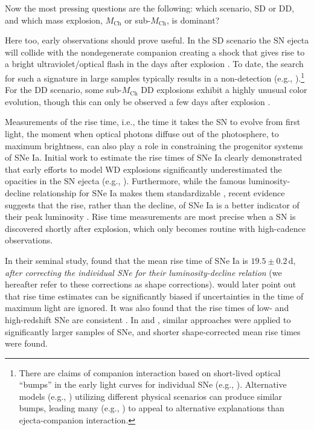 \documentclass[twocolumn]{./aastex63}
\begin{document}
Now the most pressing questions are the following: which scenario, SD or DD,
and which mass explosion, $M_\mathrm{Ch}$ or sub-$M_\mathrm{Ch}$, is dominant?

Here too, early observations should prove useful. In the SD scenario the SN
ejecta will collide with the nondegenerate companion creating a shock that
gives rise to a bright ultraviolet/optical flash in the days after explosion
\citep{Kasen10a}. To date, the search for such a signature in large samples
typically results in a non-detection (e.g.,
\citealt{Hayden10,Ganeshalingam11,Bianco11}).\footnote{There are claims of
companion interaction based on short-lived optical ``bumps'' in the early
light curves for individual SNe (e.g.,
\citealt{Cao15,Marion16,Hosseinzadeh17,Dimitriadis19}). Alternative models
(e.g., \citealt{Dessart14,Piro16}) utilizing different physical scenarios can
produce similar bumps, leading many (e.g.,
\citealt{Kromer16,Shappee16a,Noebauer17,Miller18,Shappee19}) to appeal to
alternative explanations than ejecta-companion interaction.} For the DD
scenario, some sub-$M_\mathrm{Ch}$ DD explosions exhibit a highly unusual
color evolution, though this can only be observed a few days after explosion
\citep{Noebauer17,Polin19}.

Measurements of the rise time, i.e., the time it takes the SN to evolve from
first light, the moment when optical photons diffuse out of the photosphere, to
maximum brightness, can also play a role in constraining the progenitor systems
of SNe Ia. Initial work to estimate the rise times of SNe Ia clearly
demonstrated that early efforts to model WD explosions significantly
underestimated the opacities in the SN ejecta (e.g., \citealt{Riess99a}).
Furthermore, while the famous luminosity-decline relationship for SNe Ia makes
them standardizable \citep{Phillips93}, recent evidence suggests that the rise,
rather than the decline, of SNe Ia is a better indicator of their peak
luminosity \citep{Hayden19}. Rise time measurements are most precise when a SN
is discovered shortly after explosion, which only becomes routine with
high-cadence observations.

In their seminal study, \citet{Riess99a} found that the mean rise time of SNe
Ia is $19.5 \pm 0.2$\,d, \textit{after correcting the individual SNe for their
luminosity-decline relation} (we hereafter refer to these corrections as shape
corrections). \citet{Aldering00} would later point out that rise time
estimates can be significantly biased if uncertainties in the time of maximum
light are ignored. It was also found that the rise times of low- and
high-redshift SNe are consistent \citep{Aldering00,Conley06}. In
\citet{Hayden10} and \citet{Ganeshalingam11}, similar approaches were applied
to significantly larger samples of SNe, and shorter shape-corrected mean rise
times were found.
\end{document}
